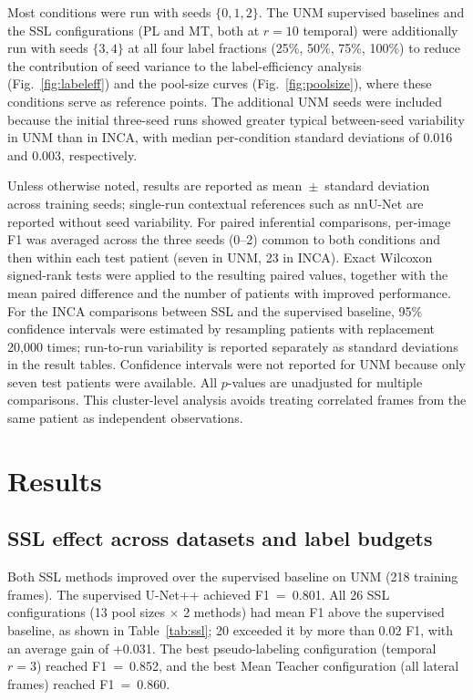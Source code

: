 \documentclass[a4paper,fleqn]{cas-dc}
\begin{document}
Most conditions were run with seeds $\{0, 1, 2\}$. The UNM supervised baselines and the SSL configurations (PL and MT, both at $r{=}10$ temporal) were additionally run with seeds $\{3, 4\}$ at all four label fractions (25\%, 50\%, 75\%, 100\%) to reduce the contribution of seed variance to the label-efficiency analysis (Fig.~\ref{fig:labeleff}) and the pool-size curves (Fig.~\ref{fig:poolsize}), where these conditions serve as reference points. The additional UNM seeds were included because the initial three-seed runs showed greater typical between-seed variability in UNM than in INCA, with median per-condition standard deviations of 0.016 and 0.003, respectively.

Unless otherwise noted, results are reported as mean~$\pm$~standard deviation across training seeds; single-run contextual references such as nnU-Net are reported without seed variability. For paired inferential comparisons, per-image F1 was averaged across the three seeds (0--2) common to both conditions and then within each test patient (seven in UNM, 23 in INCA). Exact Wilcoxon signed-rank tests were applied to the resulting paired values, together with the mean paired difference and the number of patients with improved performance. For the INCA comparisons between SSL and the supervised baseline, 95\% confidence intervals were estimated by resampling patients with replacement 20{,}000 times; run-to-run variability is reported separately as standard deviations in the result tables. Confidence intervals were not reported for UNM because only seven test patients were available. All $p$-values are unadjusted for multiple comparisons. This cluster-level analysis avoids treating correlated frames from the same patient as independent observations.


\FloatBarrier

\section{Results}
\label{sec:results}

\subsection{SSL effect across datasets and label budgets}

Both SSL methods improved over the supervised baseline on UNM (218 training frames). The supervised U-Net++ achieved F1~=~0.801. All 26 SSL configurations (13 pool sizes $\times$ 2 methods) had mean F1 above the supervised baseline, as shown in Table~\ref{tab:ssl}; 20 exceeded it by more than 0.02 F1, with an average gain of +0.031. The best pseudo-labeling configuration (temporal $r{=}3$) reached F1~=~0.852, and the best Mean Teacher configuration (all lateral frames) reached F1~=~0.860.
\end{document}
